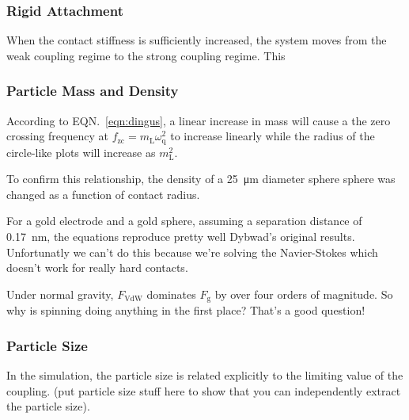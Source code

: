 \documentclass[floatfix,superscriptaddress,a4paper,notitlepage]{revtex4-1}
\newcommand{\Equation}[1]{EQN.~\ref{#1}}
\newcommand{\Table}[1]{TBL.~\ref{#1}}
\newcommand{\ml}{m_\mathrm{L}}
\newcommand{\omegaq}{\omega_\mathrm{q}}
\begin{document}


\subsubsection{Rigid Attachment}
When the contact stiffness is sufficiently increased, the system moves from
the weak coupling regime to the strong coupling regime.  This 


\subsubsection{Particle Mass and Density}
According to \Equation{eqn:dingus}, a linear increase in mass will cause a
the zero crossing frequency at 
$f_\mathrm{zc} = \ml \omegaq^2$ to increase linearly while the radius of
the circle-like plots will increase as $\ml^2$.

To confirm this relationship, the density of a \SI{25}{\micro\meter}
diameter sphere sphere was changed as a function of contact radius.

For a gold electrode and a gold sphere, assuming a separation distance of
\SI{0.17}{\nano\meter}, the equations reproduce pretty well Dybwad's
original results.  Unfortunatly we can't do this because we're solving the
Navier-Stokes which doesn't work for really hard contacts.

Under normal gravity, $F_\mathrm{VdW}$ dominates $F_\mathrm{g}$ by over
four orders of magnitude.  So why is spinning doing anything in the first
place?  That's a good question!

\subsubsection{Particle Size}
In the simulation, the particle size is related explicitly to the limiting
value of the coupling.
(put particle size stuff here to show that you can independently extract
the particle size).
\end{document}
